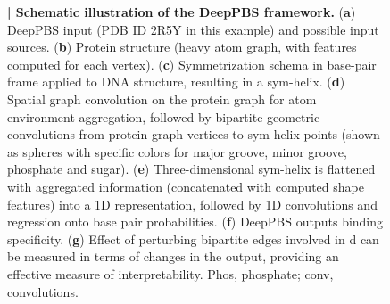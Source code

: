 \begin{center}
    \begin{figure}
        \caption[Schematic illustration of the DeepPBS framework]{\textbf{| Schematic illustration of the DeepPBS framework.} ({\bf a}) DeepPBS input
(PDB ID 2R5Y in this example) and possible input sources. ({\bf b}) Protein structure (heavy atom graph, with features computed for each vertex). ({\bf c}) Symmetrization schema in base-pair frame applied to DNA structure, resulting in a sym-helix. ({\bf d}) Spatial graph convolution on the protein graph for atom environment aggregation, followed by bipartite geometric convolutions from protein graph vertices to sym-helix points (shown as spheres with specific colors for major groove, minor groove, phosphate and sugar). ({\bf e}) Three-dimensional sym-helix is flattened with aggregated information (concatenated with computed shape features) into a 1D representation, followed by 1D convolutions and regression onto base pair probabilities. ({\bf f}) DeepPBS outputs binding specificity. ({\bf g}) Effect of perturbing bipartite edges involved in d can be measured in terms of changes in the output, providing an effective measure of interpretability. Phos, phosphate; conv, convolutions.}
  \label{fig:pdna1}
\end{figure}
\end{center}

